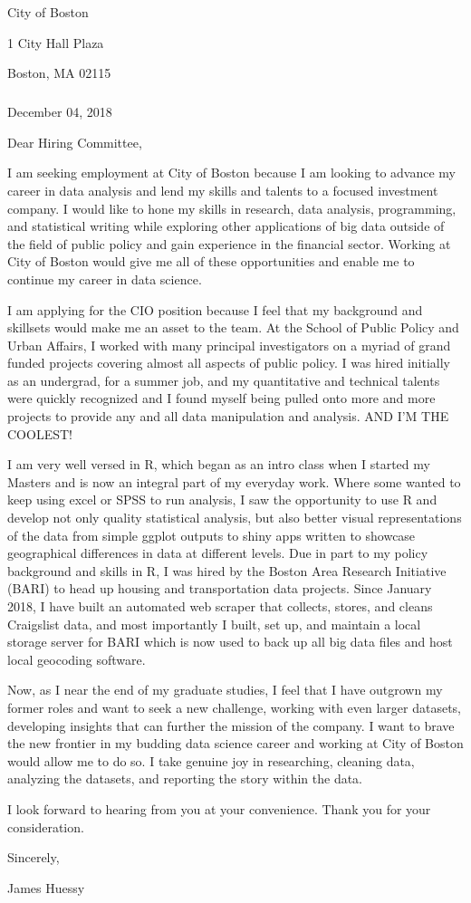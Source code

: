 \documentclass[]{article}
\title{}
\author{}
\date{}
\let\oldsubparagraph\subparagraph
\renewcommand{\subparagraph}[1]{\oldsubparagraph{#1}\mbox{}}
\begin{document}
City of Boston

1 City Hall Plaza

Boston, MA 02115

\hypertarget{section}{%
\subparagraph{}\label{section}}

December 04, 2018

Dear Hiring Committee,

I am seeking employment at City of Boston because I am looking to
advance my career in data analysis and lend my skills and talents to a
focused investment company. I would like to hone my skills in research,
data analysis, programming, and statistical writing while exploring
other applications of big data outside of the field of public policy and
gain experience in the financial sector. Working at City of Boston would
give me all of these opportunities and enable me to continue my career
in data science.

I am applying for the CIO position because I feel that my background and
skillsets would make me an asset to the team. At the School of Public
Policy and Urban Affairs, I worked with many principal investigators on
a myriad of grand funded projects covering almost all aspects of public
policy. I was hired initially as an undergrad, for a summer job, and my
quantitative and technical talents were quickly recognized and I found
myself being pulled onto more and more projects to provide any and all
data manipulation and analysis. AND I'M THE COOLEST!

I am very well versed in R, which began as an intro class when I started
my Masters and is now an integral part of my everyday work. Where some
wanted to keep using excel or SPSS to run analysis, I saw the
opportunity to use R and develop not only quality statistical analysis,
but also better visual representations of the data from simple ggplot
outputs to shiny apps written to showcase geographical differences in
data at different levels. Due in part to my policy background and skills
in R, I was hired by the Boston Area Research Initiative (BARI) to head
up housing and transportation data projects. Since January 2018, I have
built an automated web scraper that collects, stores, and cleans
Craigslist data, and most importantly I built, set up, and maintain a
local storage server for BARI which is now used to back up all big data
files and host local geocoding software.

Now, as I near the end of my graduate studies, I feel that I have
outgrown my former roles and want to seek a new challenge, working with
even larger datasets, developing insights that can further the mission
of the company. I want to brave the new frontier in my budding data
science career and working at City of Boston would allow me to do so. I
take genuine joy in researching, cleaning data, analyzing the datasets,
and reporting the story within the data.

I look forward to hearing from you at your convenience. Thank you for
your consideration.

Sincerely,

James Huessy
\end{document}
